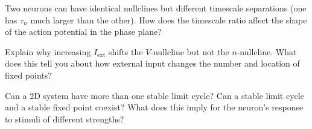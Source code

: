 \begin{conceptquestions}
  \item Two neurons can have identical nullclines but different timescale separations (one has $\tau_n$ much larger than the other). How does the timescale ratio affect the shape of the action potential in the phase plane?

  \item Explain why increasing $I_{\text{ext}}$ shifts the $V$-nullcline but not the $n$-nullcline. What does this tell you about how external input changes the number and location of fixed points?

  \item Can a 2D system have more than one stable limit cycle? Can a stable limit cycle and a stable fixed point coexist? What does this imply for the neuron's response to stimuli of different strengths?
\end{conceptquestions}
